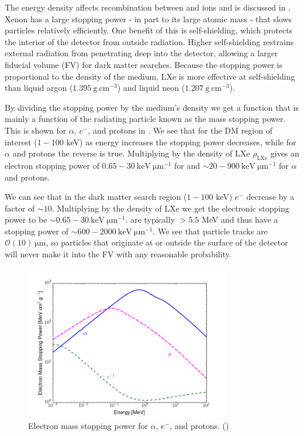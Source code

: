 The energy density affects recombination between \electron and ions and is discussed in .  Xenon
has a large stopping power - in part to its large atomic mass - that slows particles relatively efficiently.  One benefit of this
is self-shielding, which protects the interior of the detector from outside radiation.  Higher self-shielding restrains external
radiation from penetrating deep into the detector,
allowing a larger fiducial volume (FV) for dark matter searches.  Because the stopping power is proportional to the
density of the medium, LXe is more effective at self-shielding than liquid argon ($1.395\ \mathrm{g\ cm^{-3}}$) and liquid neon
($1.207\ \mathrm{g\ cm^{-3}}$).

By dividing the stopping power by the medium's density we get a function that is mainly a function of the radiating particle known as
the mass stopping power.  This is shown for $\alpha$, $e^{-}$, and protons in .  We see that for the DM
region of interest ($1-100$ keV) as \electron
energy increases the stopping power decreases, while for $\alpha$ and protons the reverse is true.  Multiplying by the density of LXe
$\rho_{\mathrm{LXe}}$ gives an electron stopping power of $0.65-30\ \mathrm{keV\ \mu m^{-1}}$ for \electron and
$\sim 20-900\ \mathrm{keV\ \mu m^{-1}}$ for $\alpha$ and protons.

We can see that in
the dark matter search region ($1-100$ keV) $e^{-}$ decrease by a factor of $\sim 10$.  Multiplying by the density of LXe we get the
electronic stopping power to be $\sim 0.65-30\ \mathrm{keV\ \mu m^{-1}}$.  \alphadecays are typically $> 5.5$ MeV and thus have a stopping
power of $\sim 600-2000\ \mathrm{keV\ \mu m^{-1}}$.  We see that particle tracks are $\mathcal{O}(10)\ \mathrm{\mu m}$, so particles
that originate at or outside the surface of the detector will never make it into the FV with any reasonable probability.

\begin{figure}[t]
\includegraphics[width=0.8\textwidth]{MassStoppingPower}
\caption{Electron mass stopping power for $\alpha$, $e^{-}$, and protons.  ()}
\label{fig:mass_stopping_power}
\end{figure}

